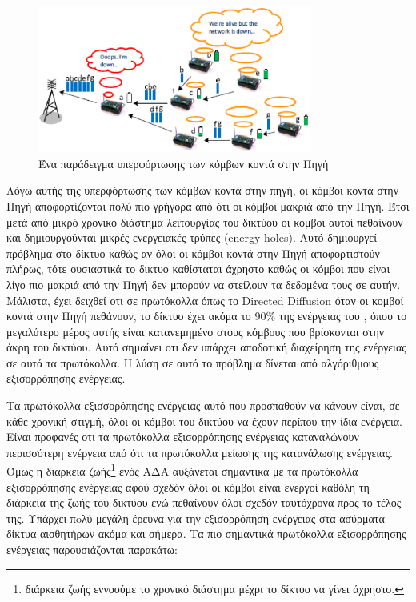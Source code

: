 \begin{figure}[h]
	\centering
	\includegraphics[width=0.8\textwidth]{images/energy_holes.eps}
	\caption{Ένα παράδειγμα υπερφόρτωσης των κόμβων κοντά στην Πηγή}
	\label{fig:energy_holes}
\end{figure}

Λόγω αυτής της υπερφόρτωσης των κόμβων κοντά στην πηγή, οι κόμβοι κοντά στην Πηγή αποφορτίζονται πολύ πιο γρήγορα από ότι οι κόμβοι μακριά από την
Πηγή. Έτσι μετά από μικρό χρονικό διάστημα λειτουργίας του δικτύου οι κόμβοι αυτοί πεθαίνουν και δημιουργούνται μικρές ενεργειακές τρύπες (energy holes). Αυτό
δημιουργεί πρόβλημα στο δίκτυο καθώς αν όλοι οι κόμβοι κοντά στην Πηγή αποφορτιστούν πλήρως, τότε ουσιαστικά το δικτυο καθίσταται άχρηστο καθώς οι κόμβοι που είναι
λίγο πιο μακριά από την Πηγή δεν μπορούν να στείλουν τα δεδομένα τους σε αυτήν. Μάλιστα, έχει δειχθεί οτι σε πρωτόκολλα όπως το Directed Diffusion όταν οι κομβοί
κοντά στην Πηγή πεθάνουν, το δίκτυο έχει ακόμα το 90\% της ενέργειας του \cite{energy_holes}, όπου το μεγαλύτερο μέρος αυτής είναι κατανεμημένο στους κόμβους που
βρίσκονται στην άκρη του δικτύου. Αυτό σημαίνει οτι δεν υπάρχει αποδοτική διαχείρηση της ενέργειας σε αυτά τα πρωτόκολλα. Η λύση σε αυτό το πρόβλημα δίνεται από
αλγόριθμους εξισορρόπησης ενέργειας.

Τα πρωτόκολλα εξισσορόπησης ενέργειας αυτό που προσπαθούν να κάνουν είναι, σε κάθε χρονική στιγμή, όλοι οι κόμβοι του δικτύου να έχουν περίπου την ίδια ενέργεια.
Είναι προφανές οτι τα πρωτόκολλα εξισορρόπησης ενέργειας καταναλώνουν περισσότερη ενέργεια από ότι τα πρωτόκολλα μείωσης της κατανάλωσης ενέργειας. Όμως η διαρκεια
ζωής\footnote{διάρκεια ζωής εννοούμε το χρονικό διάστημα μέχρι το δίκτυο να γίνει άχρηστο.} ενός ΑΔΑ αυξάνεται σημαντικά με τα πρωτόκολλα εξισορρόπησης ενέργειας
αφού σχεδόν όλοι οι κόμβοι είναι ενεργοί καθόλη τη διάρκεια της ζωής του δικτύου ενώ πεθαίνουν όλοι σχεδόν ταυτόχρονα προς το τέλος της. Υπάρχει πoλύ μεγάλη έρευνα
για την εξισορρόπηση ενέργειας στα ασύρματα δίκτυα αισθητήρων ακόμα και σήμερα. Τα πιο σημαντικά πρωτόκολλα
εξισορρόπησης ενέργειας παρουσιάζονται παρακάτω:

